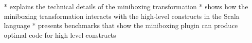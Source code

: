 
 * explains the technical details of the miniboxing transformation
 * shows how the miniboxing transformation interacts with the high-level constructs in the Scala language
 * presents benchmarks that show the miniboxing plugin can produce optimal code for high-level constructs